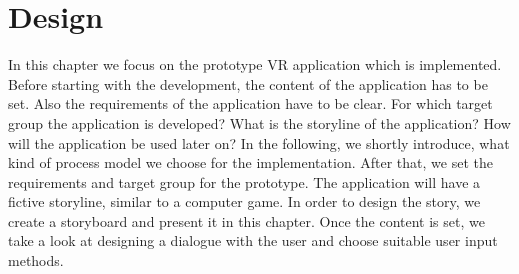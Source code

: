 \chapter{Design} \label{design}
In this chapter we focus on the prototype VR application which is implemented. Before starting with the development, the content of the application has to be set. Also the requirements of the application have to be clear. For which target group the application is developed? What is the storyline of the application? How will the application be used later on? In the following, we shortly introduce, what kind of process model we choose for the implementation. After that, we set the requirements and target group for the prototype. The application will have a fictive storyline, similar to a computer game. In order to design the story, we create a storyboard and present it in this chapter. Once the content is set, we take a look at designing a dialogue with the user and choose suitable user input methods.
